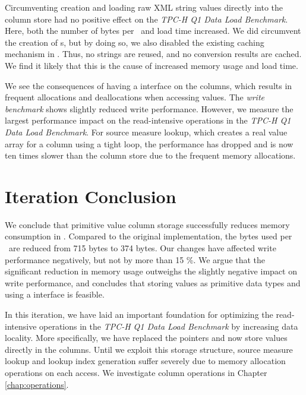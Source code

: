 Circumventing  creation and loading raw XML string values directly into the column store had no positive effect on the \textit{TPC-H Q1 Data Load Benchmark}. Here, both the number of bytes per \lineitem~and load time increased. We did circumvent the creation of s, but by doing so, we also disabled the existing caching mechanism in \gap. Thus, no strings are reused, and no conversion results are cached. We find it likely that this is the cause of increased memory usage and load time.

We see the consequences of having a  interface on the columns, which results in frequent allocations and deallocations when accessing values. The \textit{write benchmark} shows slightly reduced write performance. However, we measure the largest performance impact on the read-intensive operations in the \textit{TPC-H Q1 Data Load Benchmark}. For source measure lookup, which creates a real value array for a column using a tight loop, the performance has dropped and is now ten times slower than the  column store due to the frequent memory allocations.


\section{Iteration Conclusion}
\label{sec:Iteration Conclusion}
We conclude that primitive value column storage successfully reduces memory consumption in \gap. Compared to the original implementation, the bytes used per \lineitem~are reduced from 715 bytes to 374 bytes. Our changes have affected write performance negatively, but not by more than 15 \%. We argue that the significant reduction in memory usage outweighs the slightly negative impact on write performance, and concludes that storing values as primitive data types and using a  interface is feasible. 

In this iteration, we have laid an important foundation for optimizing the read-intensive operations in the \textit{TPC-H Q1 Data Load Benchmark} by increasing data locality. More specifically, we have replaced the  pointers and now store values directly in the columns. Until we exploit this storage structure, source measure lookup and lookup index generation suffer severely due to memory allocation operations on each access. We investigate column operations in Chapter \ref{chap:operations}.

